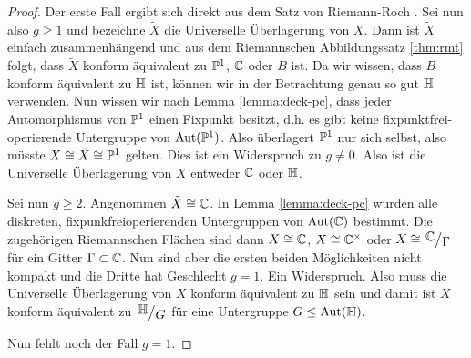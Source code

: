 \begin{proof}
  Der erste Fall ergibt sich direkt aus dem Satz von Riemann-Roch
  \cite[Kor. 16.13]{For}. Sei
  nun also $g \geq 1$ und bezeichne $\tilde X$ die Universelle
  Überlagerung von $X$. Dann ist $\tilde X$ einfach zusammenhängend
  und aus dem Riemannschen Abbildungssatz \ref{thm:rmt} folgt, dass
  $\tilde X$ konform äquivalent zu $\P^1$, $\C$ oder $B$ ist. Da wir
  wissen, dass $B$ konform äquivalent zu $\h$ ist, können wir in der
  Betrachtung genau so gut $\h$ verwenden. Nun wissen wir nach Lemma
  \ref{lemma:deck-pc}, dass jeder Automorphismus von $\P^1$ einen
  Fixpunkt besitzt, d.h. es gibt keine fixpunktfrei-operierende
  Untergruppe von $\Aut(\P^1)$. Also überlagert $\P^1$ nur sich
  selbst, also müsste $X \cong \tilde X \cong \P^1$ gelten. Dies ist
  ein Widerspruch zu $g \neq 0$. Also ist die Universelle Überlagerung
  von $X$ entweder $\C$ oder $\h$.

  Sei nun $g \geq 2$. Angenommen $\tilde X \cong \C$. In Lemma
  \ref{lemma:deck-pc} wurden alle diskreten, fixpunkfreioperierenden
  Untergruppen von $\Aut(\C)$ bestimmt. Die zugehörigen Riemannschen
  Flächen sind dann $X \cong \C$, $X \cong \C^\times$ oder $X \cong
  \quot{\C}{\Gamma}$ für ein Gitter $\Gamma \subset \C$. Nun sind aber
  die ersten beiden Möglichkeiten nicht kompakt und die Dritte hat
  Geschlecht $g =1$. Ein Widerspruch. Also muss die Universelle
  Überlagerung von $X$ konform äquivalent zu $\h$ sein und damit ist
  $X$ konform äquivalent zu $\quot{\h}{G}$ für eine Untergruppe $G
  \leq \Aut(\h)$.

  Nun fehlt noch der Fall $g = 1$.
\end{proof}

